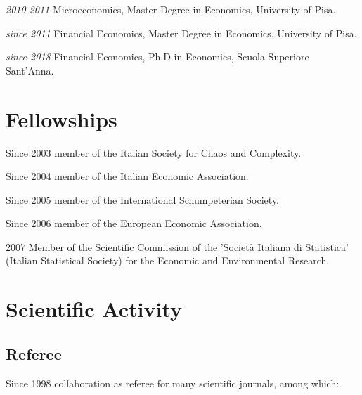 \documentclass[a4paper]{article}
\begin{document}
\emph{2010-2011} Microeconomics, Master Degree in Economics, University of Pisa.

\emph{since 2011} Financial Economics, Master Degree in Economics, University of Pisa.

\emph{since 2018} Financial Economics, Ph.D in Economics, Scuola Superiore Sant'Anna.


\section{Fellowships%
  \label{fellowships}%
}

Since 2003 member of the Italian Society for Chaos and Complexity.

Since 2004 member of the Italian Economic Association.

Since 2005 member of the International Schumpeterian Society.

Since 2006 member of the European Economic Association.

2007 Member of the Scientific Commission of the 'Società Italiana di
Statistica' (Italian Statistical Society) for the Economic and
Environmental Research.


\section{Scientific Activity%
  \label{scientific-activity}%
}


\subsection{Referee%
  \label{referee}%
}

Since 1998 collaboration as referee for many scientific journals,
among which:
\end{document}
